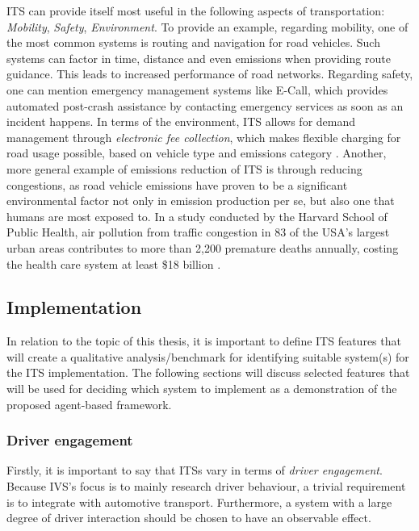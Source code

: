 \documentclass[main.tex]{subfiles}
\begin{document}
ITS can provide itself most useful in the following aspects of transportation: 
\emph{Mobility}, \emph{Safety}, \emph{Environment}. To provide an example, regarding mobility, 
one of the most common systems is routing and navigation for road vehicles. Such systems can 
factor in time, distance and even emissions when providing route guidance. This leads to 
increased performance of road networks. Regarding safety, one can mention emergency management
systems like E-Call, which provides automated post-crash assistance by contacting emergency
services as soon as an incident happens. In terms of the environment, 
ITS allows for demand management through \emph{electronic fee collection}, which makes flexible 
charging for road usage possible, based on vehicle type and emissions category \cite{Commision2022}.
Another, more general example of emissions reduction of ITS is through reducing congestions, as road vehicle 
emissions have proven to be a significant environmental factor not only in emission production
per se, but also one that humans are most exposed to. In a study conducted by the Harvard
School of Public Health, air pollution from traffic congestion in 83 of the USA's largest urban
areas contributes to more than 2,200 premature deaths annually, costing the health care system at
least \$18 billion \cite{Levy2011}.

\subsection{Implementation}

In relation to the topic of this thesis, it is important to define ITS features that will create a
qualitative analysis/benchmark for identifying suitable system(s) for the ITS implementation. The following 
sections will discuss selected features that will be used for deciding which system to implement as a demonstration
of the proposed agent-based framework.

\subsubsection{Driver engagement}

Firstly, it is important to say that ITSs vary in terms of \emph{driver engagement}. Because
IVS's focus is to mainly research driver behaviour, a trivial requirement is to integrate with 
automotive transport. Furthermore, a system with a large degree of driver interaction should be
chosen to have an observable effect. 
\end{document}
